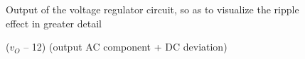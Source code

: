 \par
\begin{figure}[H] \centering
\caption{Output of the voltage regulator circuit, so as to visualize the ripple effect in greater detail}
\label{fig:regulator}
\end{figure}

\par
\begin{figure}[H] \centering
\caption{($v_O$ – 12) (output AC component + DC deviation)}
\label{fig:deviation}
\end{figure}









\pagebreak


